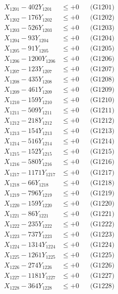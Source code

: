 \documentclass[a4paper,10pt]{article}
\begin{document}
{\begin{align}
\allowbreak
X_{1201} - 402Y_{1201} &\leq +0 && \text{(G1201)} \\
X_{1202} - 176Y_{1202} &\leq +0 && \text{(G1202)} \\
X_{1203} - 526Y_{1203} &\leq +0 && \text{(G1203)} \\
X_{1204} - 93Y_{1204} &\leq +0 && \text{(G1204)} \\
X_{1205} - 91Y_{1205} &\leq +0 && \text{(G1205)} \\
X_{1206} - 1200Y_{1206} &\leq +0 && \text{(G1206)} \\
X_{1207} - 123Y_{1207} &\leq +0 && \text{(G1207)} \\
X_{1208} - 435Y_{1208} &\leq +0 && \text{(G1208)} \\
X_{1209} - 461Y_{1209} &\leq +0 && \text{(G1209)} \\
X_{1210} - 159Y_{1210} &\leq +0 && \text{(G1210)} \\
\allowbreak
X_{1211} - 509Y_{1211} &\leq +0 && \text{(G1211)} \\
X_{1212} - 218Y_{1212} &\leq +0 && \text{(G1212)} \\
X_{1213} - 154Y_{1213} &\leq +0 && \text{(G1213)} \\
X_{1214} - 516Y_{1214} &\leq +0 && \text{(G1214)} \\
X_{1215} - 152Y_{1215} &\leq +0 && \text{(G1215)} \\
X_{1216} - 580Y_{1216} &\leq +0 && \text{(G1216)} \\
X_{1217} - 1171Y_{1217} &\leq +0 && \text{(G1217)} \\
X_{1218} - 66Y_{1218} &\leq +0 && \text{(G1218)} \\
X_{1219} - 796Y_{1219} &\leq +0 && \text{(G1219)} \\
X_{1220} - 159Y_{1220} &\leq +0 && \text{(G1220)} \\
\allowbreak
X_{1221} - 86Y_{1221} &\leq +0 && \text{(G1221)} \\
X_{1222} - 235Y_{1222} &\leq +0 && \text{(G1222)} \\
X_{1223} - 737Y_{1223} &\leq +0 && \text{(G1223)} \\
X_{1224} - 1314Y_{1224} &\leq +0 && \text{(G1224)} \\
X_{1225} - 1261Y_{1225} &\leq +0 && \text{(G1225)} \\
X_{1226} - 274Y_{1226} &\leq +0 && \text{(G1226)} \\
X_{1227} - 1181Y_{1227} &\leq +0 && \text{(G1227)} \\
X_{1228} - 364Y_{1228} &\leq +0 && \text{(G1228)} \\

\end{align}}
\end{document}
